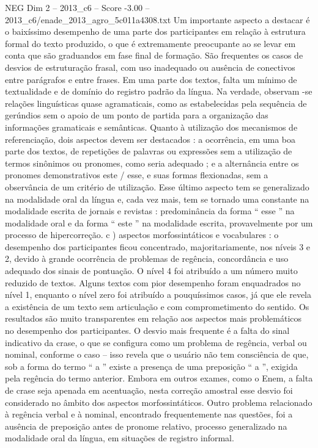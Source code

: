 \begin{textsample}{NEG Dim 2 – 2013\_c6 – Score -3.00 – 2013\_c6/enade\_2013\_agro\_5c011a4308.txt}
Um importante aspecto a destacar é o baixíssimo desempenho de uma parte dos participantes em relação à estrutura formal do texto produzido, o que é extremamente preocupante ao se levar em conta que são graduandos em fase final de formação.
São frequentes os casos de desvios de estruturação frasal, com uso inadequado ou ausência de conectivos entre parágrafos e entre frases.
Em uma parte dos textos, falta um mínimo de textualidade e de domínio do registro padrão da língua.
Na verdade, observam -se relações linguísticas quase agramaticais, como as estabelecidas pela sequência de gerúndios sem o apoio de um ponto de partida para a organização das informações gramaticais e semânticas.
Quanto à utilização dos mecanismos de referenciação, dois aspectos devem ser destacados : a ocorrência, em uma boa parte dos textos, de repetições de palavras ou expressões sem a utilização de termos sinônimos ou pronomes, como seria adequado ; e a alternância entre os pronomes demonstrativos este / esse, e suas formas flexionadas, sem a observância de um critério de utilização.
Esse último aspecto tem se generalizado na modalidade oral da língua e, cada vez mais, tem se tornado uma constante na modalidade escrita de jornais e revistas : predominância da forma “ esse ” na modalidade oral e da forma “ este ” na modalidade escrita, provavelmente por um processo de hipercorreção. c ) aspectos morfossintáticos e vocabulares : o desempenho dos participantes ficou concentrado, majoritariamente, nos níveis 3 e 2, devido à grande ocorrência de problemas de regência, concordância e uso adequado dos sinais de pontuação.
O nível 4 foi atribuído a um número muito reduzido de textos.
Alguns textos com pior desempenho foram enquadrados no nível 1, enquanto o nível zero foi atribuído a pouquíssimos casos, já que ele revela a existência de um texto sem articulação e com comprometimento do sentido.
Os resultados são muito transparentes em relação aos aspectos mais problemáticos no desempenho dos participantes.
O desvio mais frequente é a falta do sinal indicativo da crase, o que se configura como um problema de regência, verbal ou nominal, conforme o caso – isso revela que o usuário não tem consciência de que, sob a forma do termo “ a ” existe a presença de uma preposição “ a ”, exigida pela regência do termo anterior.
Embora em outros exames, como o Enem, a falta de crase seja apenada em acentuação, nesta correção amostral esse desvio foi considerado no âmbito dos aspectos morfossintáticos.
Outro problema relacionado à regência verbal e à nominal, encontrado frequentemente nas questões, foi a ausência de preposição antes de pronome relativo, processo generalizado na modalidade oral da língua, em situações de registro informal.

\end{textsample}
